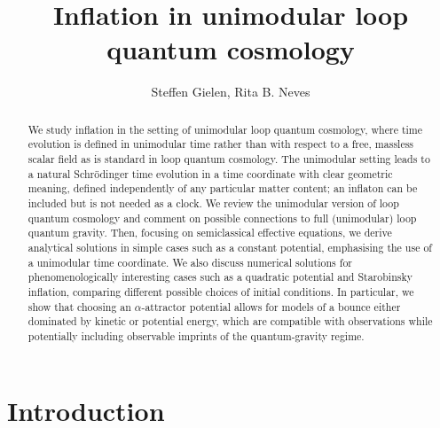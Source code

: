 \documentclass[aps,prd,11pt,showkeys,nofootinbib]{revtex4-2}
\begin{document}
 
\title{\bf Inflation in unimodular loop quantum cosmology}

\author{Steffen Gielen, Rita B. Neves}


\begin{abstract}
We study inflation in the setting of unimodular loop quantum cosmology, where time evolution is defined in unimodular time rather than with respect to a free, massless scalar field as is standard in loop quantum cosmology. The unimodular setting leads to a natural Schr\"odinger time evolution in a time coordinate with clear geometric meaning, defined independently of any particular matter content; an inflaton can be included but is not needed as a clock. We review the unimodular version of loop quantum cosmology and comment on possible connections to full (unimodular) loop quantum gravity. Then, focusing on semiclassical effective equations, we derive analytical solutions in simple cases such as a constant potential, emphasising the use of a unimodular time coordinate. We also discuss numerical solutions for phenomenologically interesting cases such as a quadratic potential and Starobinsky inflation, comparing different possible choices of initial conditions. In particular, we show that choosing an $\alpha$-attractor potential allows for models of a bounce either dominated by kinetic or potential energy, which are compatible with observations while potentially including observable imprints of the quantum-gravity regime. 
\end{abstract}



\maketitle

\section{Introduction}
\end{document}
